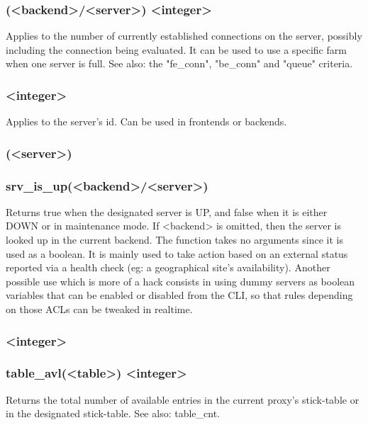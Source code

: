 \subsubsection[srv\_conn]{ (<backend>/<server>) <integer>}

Applies to the number of currently established connections on the server,
possibly including the connection being evaluated.
It can be used to use a specific farm when one server is full.
See also: the "fe\_conn", "be\_conn" and "queue" criteria.

\subsubsection[srv\_id]{ <integer>}

Applies to the server's id. Can be used in frontends or backends.

\subsubsection[srv\_is\_up]{ (<server>)}
\subsubsection*{srv\_is\_up(<backend>/<server>)}

Returns true when the designated server is UP, and false when it is either
DOWN or in maintenance mode. If <backend> is omitted, then the server is
looked up in the current backend. The function takes no arguments since it
is used as a boolean. It is mainly used to take action based on an external
status reported via a health check (eg: a geographical site's availability).
Another possible use which is more of a hack consists in using dummy servers
as boolean variables that can be enabled or disabled from the CLI, so that
rules depending on those ACLs can be tweaked in realtime.

\subsubsection[table\_avl]{ <integer>}
\subsubsection*{table\_avl(<table>) <integer>}

Returns the total number of available entries in the current proxy's
stick-table or in the designated stick-table. See also: table\_cnt.

